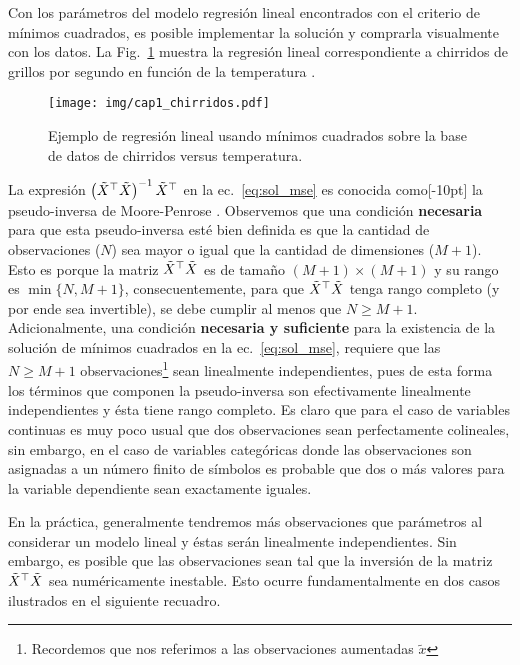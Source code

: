 Con los parámetros del modelo regresión lineal encontrados con el criterio de mínimos cuadrados, es posible implementar la solución y comprarla visualmente con los datos. La Fig.~\ref{fig:reg_lin_1} muestra la regresión lineal correspondiente a chirridos de grillos por segundo en función de la temperatura \cite{insects}.  

\begin{figure}[H]
	\centering
	\texttt{[image: img/cap1\_chirridos.pdf]}\\
	\caption{Ejemplo de regresión lineal usando mínimos cuadrados sobre la base de datos de chirridos versus temperatura.}
	\label{fig:reg_lin_1}
\end{figure}

La expresión $\left(\tilde{X}^\top\tilde{X} \right)^{-1} \tilde{X}^\top$ en la ec.~\eqref{eq:sol_mse} es conocida como[-10pt] la pseudo-inversa de Moore-Penrose \cite[p.~7]{benisrael_greville_2006}. Observemos que una condición \textbf{necesaria} para que esta pseudo-inversa esté bien definida es que la cantidad de observaciones ($N$) sea mayor o igual que la cantidad de dimensiones ($M+1$). Esto es porque la matriz $\tilde{X}^\top\tilde{X}$ es de tamaño $(M+1)\times(M+1)$ y su rango es $\min \{N, M+1\}$, consecuentemente, para que $\tilde{X}^\top\tilde{X}$ tenga rango completo (y por ende sea invertible), se debe cumplir al menos que $N\geq M+1$. Adicionalmente, una condición \textbf{necesaria y suficiente}  para la existencia de la solución de mínimos cuadrados en la ec.~\eqref{eq:sol_mse}, requiere que las $N\geq M+1$ observaciones\footnote{Recordemos que nos referimos a las observaciones aumentadas $\tilde{x}$} sean linealmente independientes, pues de esta forma los términos que componen la pseudo-inversa son efectivamente linealmente independientes y ésta tiene rango completo. Es claro que para el caso de variables continuas es muy poco usual que dos observaciones sean perfectamente colineales, sin embargo, en el caso de variables categóricas donde las observaciones son asignadas a un número finito de símbolos es probable que dos o más valores para la variable dependiente sean exactamente iguales. 

En la práctica, generalmente tendremos más observaciones que parámetros al considerar un modelo lineal y éstas serán linealmente independientes. Sin embargo, es posible que las observaciones sean tal que la inversión de la matriz  $\tilde{X}^\top\tilde{X}$ sea numéricamente  inestable. Esto ocurre fundamentalmente en dos casos ilustrados en el siguiente recuadro.  

